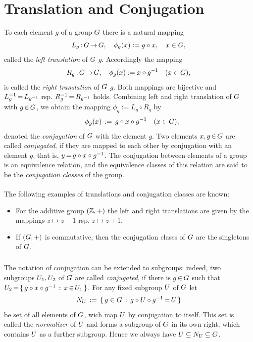\documentclass[11pt,twoside]{article}
\begin{document}
\section{Translation and Conjugation}
To each element $g$ of a group $G$ there is a natural mapping
\[
L_g{\,:\,} G {\,\to\,} G, \quad \phi_g(x) := g \circ x, \quad x \in G,
\]
called the \textit{left translation} of $G$ {\wrt} $g$.
Accordingly the mapping
\[
R_g{\,:\,} G {\,\to\,} G, \quad \phi_g(x) := x \circ g^{-1} \quad (x \in G),
\]
is called the \textit{right translation} of $G$ {\wrt} $g$.
Both mappings are bijective
and $L_g^{-1} {\,=\,} L_{g^{-1}}$ rsp. $R_g^{-1} {\,=\,} R_{g^{-1}}$ holds.
Combining left and right translation of $G$ with $g {\,\in\,} G$,
we obtain the mapping $\phi_g := L_g \circ R_g$ by
\[
\quad \phi_g(x) \,:=\, g \circ x \circ g^{-1} \quad (x \in G),
\]
denoted the \textit{conjugation} of $G$ with the element $g$.
Two elements $x,y {\,\in\,} G$ are called \textit{conjugated},
if they are mapped to each other by conjugation with an element $g$,
that is,
$y {\,=\,} g \circ x \circ g^{-1}$.
The conjugation between elements of a group is an equivalence relation,
and the equivalence classes of this relation are said to be
the \textit{conjugation classes} of the group.

\paragraph{}
The following examples of translations and conjugation classes are known:

\begin{itemize}[leftmargin=15pt]
\item[1.]
For the additive group $({\mathbb{Z}},+)$ the left and right translations
are given by the mappings $z \mapsto z-1$ rsp. $z \mapsto z+1$.

\item[2.]
If $(G,+)$ is commutative,
then the conjugation classs of $G$ are the singletons of $G$.
\end{itemize}

\subparagraph{}
The notation of conjugation can be extended to subgroups:
indeed,
two subgroups $U_1,U_2$ of $G$ are called \textit{conjugated},
if there is $g {\,\in\,} G$ such that
$U_2 {\,=\,} \{ \, g \circ x \circ g^{-1} \,: \, x {\,\in\,} U_1 \, \}$.
For any fixed subgroup $U$ of $G$ let
\[
N_{U} \,:=\, \{ \, g \in G \,: \, g \circ U \circ g^{-1} {\,=\,} U \, \}
\]
be set of all elements of $G$,
wich map $U$ by conjugation to itself.
This set is called the \textit{normalizer} of $U$ and forms a subgroup
of $G$ in its own right,
which contains $U$ as a further subgroup.
Hence we always have $U \subseteq N_{U} \subseteq G$.
\end{document}
